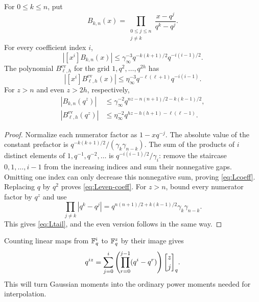 \begin{lemma}\label{lem:interpolation}
For \(0\le k\le n\), put
\[
 B_{k,n}(x)=\prod_{\substack{0\le j\le n\\j\ne k}}
                   \frac{x-q^j}{q^k-q^j}.
\]
For every coefficient index \(i\),
\begin{equation}\label{eq:Lcoeff}
 |[x^i]B_{k,n}(x)|
    \le\gamma_\infty^{-3}
       q^{-k(k+1)/2}q^{-i(i-1)/2}.
\end{equation}
The polynomial \(B^{\mathrm{ev}}_{\ell,h}\) for the grid
\(1,q^2,\ldots,q^{2h}\) has
\begin{equation}\label{eq:Leven-coeff}
 |[x^i]B^{\mathrm{ev}}_{\ell,h}(x)|
    \le\eta_\infty^{-3}
       q^{-\ell(\ell+1)}q^{-i(i-1)}.
\end{equation}
For \(z>n\) and even \(z>2h\), respectively,
\begin{align}
 |B_{k,n}(q^z)|
    &\le\gamma_\infty^{-2}
       q^{nz-n(n+1)/2-k(k-1)/2},\label{eq:Ltail}\\
 |B^{\mathrm{ev}}_{\ell,h}(q^z)|
    &\le\eta_\infty^{-2}
       q^{hz-h(h+1)-\ell(\ell-1)}.\label{eq:Leven-tail}
\end{align}
\end{lemma}

\begin{proof}
Normalize each numerator factor as \(1-xq^{-j}\).
The absolute value of the constant prefactor is
\(q^{-k(k+1)/2}/(\gamma_k\gamma_{n-k})\).
The sum of the products of \(i\) distinct elements of
\(1,q^{-1},q^{-2},\ldots\) is
\(q^{-i(i-1)/2}/\gamma_i\):
remove the staircase \(0,1,\ldots,i-1\) from the increasing
indices and sum their nonnegative gaps.
Omitting one index can only decrease this nonnegative sum,
proving \eqref{eq:Lcoeff}. Replacing \(q\) by \(q^2\) proves
\eqref{eq:Leven-coeff}.
For \(z>n\), bound every numerator factor by \(q^z\) and use
\[
 \prod_{j\ne k}|q^k-q^j|
 =q^{n(n+1)/2+k(k-1)/2}\gamma_k\gamma_{n-k}.
\]
This gives \eqref{eq:Ltail}, and the even version follows in the same way.
\end{proof}

Counting linear maps from \(\mathbb F_q^i\) to \(\mathbb F_q^z\) by their image gives
\begin{equation}\label{eq:power-conversion}
 q^{iz}=\sum_{j=0}^i
          \left(\prod_{r=0}^{j-1}(q^i-q^r)\right)\qbin z j.
\end{equation}
This will turn Gaussian moments into the ordinary power moments
needed for interpolation.

